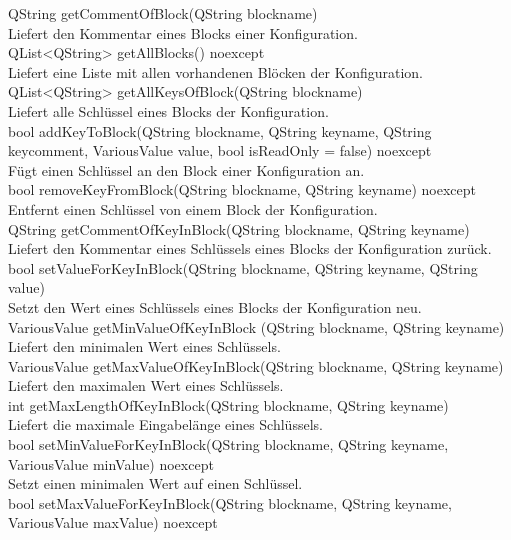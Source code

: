 \small{QString getCommentOfBlock(QString blockname)}\\
Liefert den Kommentar eines Blocks einer Konfiguration. \bigskip \\
\small{QList<QString> getAllBlocks() noexcept}\\
Liefert eine Liste mit allen vorhandenen Blöcken der Konfiguration.\bigskip \\
\small{QList<QString> getAllKeysOfBlock(QString blockname)}\\
Liefert alle Schlüssel eines Blocks der Konfiguration.\bigskip\\
\small{bool addKeyToBlock(QString blockname, QString keyname, QString keycomment, VariousValue value, bool isReadOnly = false) noexcept}\\
Fügt einen Schlüssel an den Block einer Konfiguration an.\bigskip \\
\small{bool removeKeyFromBlock(QString blockname, QString keyname) noexcept}\\
Entfernt einen Schlüssel von einem Block der Konfiguration.\bigskip \\
\small{QString getCommentOfKeyInBlock(QString blockname, QString keyname)}\\
Liefert den Kommentar eines Schlüssels eines Blocks der Konfiguration zurück.\bigskip\\
\small{bool setValueForKeyInBlock(QString blockname, QString keyname, QString value)}\\
Setzt den Wert eines Schlüssels eines Blocks der Konfiguration neu.\bigskip \\
\small{VariousValue getMinValueOfKeyInBlock (QString blockname, QString keyname)}\\
Liefert den minimalen Wert eines Schlüssels.\bigskip \\
\small{VariousValue getMaxValueOfKeyInBlock(QString blockname, QString keyname)}\\
Liefert den maximalen Wert eines Schlüssels.\bigskip \\
\small{int getMaxLengthOfKeyInBlock(QString blockname, QString keyname)}\\
Liefert die maximale Eingabelänge eines Schlüssels.\bigskip \\
\small{bool setMinValueForKeyInBlock(QString blockname, QString keyname, VariousValue minValue) noexcept}\\
Setzt einen minimalen Wert auf einen Schlüssel.\bigskip \\
\small{bool setMaxValueForKeyInBlock(QString blockname, QString keyname, VariousValue maxValue) noexcept}\\
